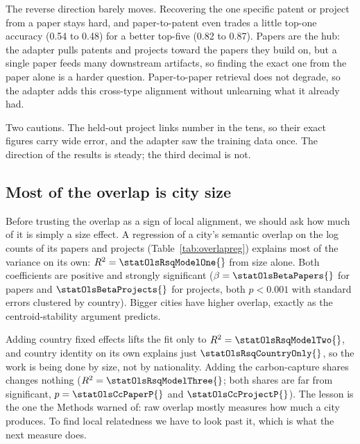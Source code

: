 \documentclass[12pt,a4paper]{article}
\begin{document}
	The reverse direction barely moves. Recovering the one specific patent or project
	from a paper stays hard, and paper-to-patent even trades a little top-one accuracy
	(0.54 to 0.48) for a better top-five (0.82 to 0.87). Papers are the hub: the
	adapter pulls patents and projects toward the papers they build on, but a single
	paper feeds many downstream artifacts, so finding the exact one from the paper
	alone is a harder question. Paper-to-paper retrieval does not degrade, so the
	adapter adds this cross-type alignment without unlearning what it already had.
	
	Two cautions. The held-out project links number in the tens, so their exact
	figures carry wide error, and the adapter saw the training data once. The
	direction of the results is steady; the third decimal is not.
	
	\subsection{Most of the overlap is city size}
	
	Before trusting the overlap as a sign of local alignment, we should ask how much of
	it is simply a size effect. A regression of a city's semantic overlap on the log
	counts of its papers and projects (Table~\ref{tab:overlapreg}) explains most of the
	variance on its own: $R^2 = \statOlsRsqModelOne{}$ from size alone. Both
	coefficients are positive and strongly significant ($\beta = \statOlsBetaPapers{}$
	for papers and $\statOlsBetaProjects{}$ for projects, both $p < 0.001$ with
	standard errors clustered by country). Bigger cities have higher overlap, exactly
	as the centroid-stability argument predicts.
	
	
	
	Adding country fixed effects lifts the fit only to $R^2 = \statOlsRsqModelTwo{}$,
	and country identity on its own explains just $\statOlsRsqCountryOnly{}$, so the
	work is being done by size, not by nationality. Adding the carbon-capture shares
	changes nothing ($R^2 = \statOlsRsqModelThree{}$; both shares are far from
	significant, $p = \statOlsCcPaperP{}$ and $\statOlsCcProjectP{}$). The lesson is the
	one the Methods warned of: raw overlap mostly measures how much a city produces. To
	find local relatedness we have to look past it, which is what the next measure does.
	
\end{document}

